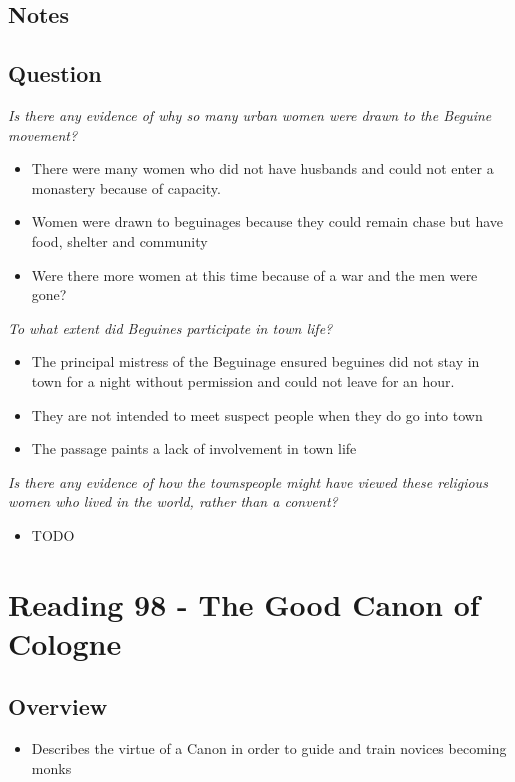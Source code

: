\documentclass[12pt]{article}
\begin{document}
\subsection*{Notes}

\subsection*{Question}

\textit{Is there any evidence of why so many urban women were drawn to the Beguine movement?}
\begin{itemize}
	\item There were many women who did not have husbands and could not enter a monastery because of capacity. 
	\item Women were drawn to beguinages because they could remain chase but have food, shelter and community
	\item Were there more women at this time because of a war and the men were gone?
\end{itemize}

\textit{To what extent did Beguines participate in town life?}
\begin{itemize}
	\item The principal mistress of the Beguinage ensured beguines did not stay in town for a night without permission and could not leave for an hour.
	\item They are not intended to meet suspect people when they do go into town
	\item The passage paints a lack of involvement in town life
\end{itemize}

\textit{Is there any evidence of how the townspeople might have viewed these religious women who lived in the world, rather than a convent?}
\begin{itemize}
	\item TODO
\end{itemize}

\section*{Reading 98 - The Good Canon of Cologne}

\subsection*{Overview}
\begin{itemize}
	\item Describes the virtue of a Canon in order to guide and train novices becoming monks
\end{itemize}
\end{document}
